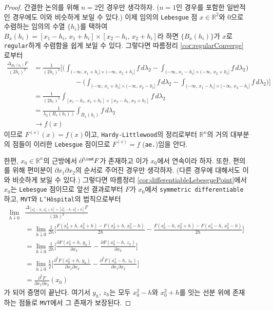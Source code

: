 \begin{proof}
    간결한 논의를 위해 $n=2$인 경우만 생각하자. ($n=1$인 경우를 포함한 일반적인 경우에도 이와 비슷하게 보일 수 있다.) 이제 임의의 \texttt{Lebesgue} 점 $x\in\mathbb{R}^2$와 $0$으로 수렴하는 임의의 수열 $\{h_i\}$를 택하여 $B_x(h_i)=[x_1-h_i,\,x_1+h_i]\times[x_2-h_i,\,x_2+h_i]$라 하면 $\{B_x(h_i)\}$가 $x$로 \texttt{regular}하게 수렴함을 쉽게 보일 수 있다. 그렇다면 따름정리 \ref{cor:regularConverge}로부터
    \begin{align*}
        \frac{\Delta_{B_x(h_i)}F}{(2h_i)^2}&=\frac{1}{(2h_i)^2}\bigg[\bigg(\int_{(-\infty,\,x_1+h_i]\times(-\infty,\,x_2+h_i]}f\,d\lambda_2-\int_{(-\infty,\,x_1-h_i]\times(-\infty,\,x_2+h_i]}f\,d\lambda_2\bigg)\\
        &\qquad\qquad\qquad-\bigg(\int_{(-\infty,\,x_1+h_i]\times(-\infty,\,x_2-h_i]}f\,d\lambda_2-\int_{(-\infty,\,x_1-h_i]\times(-\infty,\,x_2-h_i]}f\,d\lambda_2\bigg)\bigg]\\
        &=\frac{1}{(2h_i)^2}\int_{[x_1-h_i,\,x_1+h_i]\times[x_2-h_i,\,x_2+h_i]}f\,d\lambda_2\\
        &=\frac{1}{\lambda_2(B_x(h_i))}\int_{B_x(h_i)}f\,d\lambda_2\\
        &\to f(x)
    \end{align*}
    이므로 $F^{(s)}(x)=f(x)$이고, \texttt{Hardy-Littlewood}의 정리로부터 $\mathbb{R}^n$의 거의 대부분의 점들이 이러한 \texttt{Lebesgue} 점이므로 $F^{(s)}=f$ (\texttt{ae.})임을 안다.

    한편, $x_0\in\mathbb{R}^n$의 근방에서 $\partial^\ind F$가 존재하고 이가 $x_0$에서 연속이라 하자. 또한, 편의를 위해 편미분이 $\partial x_1\partial x_2$의 순서로 주어진 경우만 생각하자. (다른 경우에 대해서도 이와 비슷하게 보일 수 있다.) 그렇다면 따름정리 \ref{cor:differentiableLebesguePoint}에서 $x_0$는 \texttt{Lebesgue} 점이므로 앞선 결과로부터 $F$가 $x_0$에서 \texttt{symmetric differentiable}하고, \texttt{MVT}와 \texttt{L'H\^ospital}의 법칙으로부터
    \begin{align*}
        \lim_{h\downarrow0}&\frac{\Delta_{[x_0^1-h,\,x_0^1+h]\times[x_0^2-h,\,x_0^2+h]}F}{(2h)^2}\\
        &=\lim_{h\downarrow0}\frac{1}{2h}\bigg[\frac{F(x_0^1+h,\,x_0^2+h)-F(x_0^1+h,\,x_0^2-h)}{2h}-\frac{F(x_0^1-h,\,x_0^2+h)-F(x_0^1-h,\,x_0^2-h)}{2h}\bigg]\\
        &=\lim_{h\downarrow0}\frac{1}{2h}\bigg[\frac{\partial F(x_0^1+h,\,y_h)}{\partial x_2}-\frac{\partial F(x_0^1-h,\,z_h)}{\partial x_2}\bigg]\\
        &=\lim_{h\downarrow0}\frac{1}{2}\bigg[\frac{\partial^2F(x_0^1+h,\,y_h)}{\partial x_1\partial x_2}-\frac{\partial^2F(x_0^1-h,\,z_h)}{\partial x_1\partial x_2}\bigg]\\
        &=\frac{\partial^2 F}{\partial x_1\partial x_2}(x_0)
    \end{align*}
    가 되어 증명이 끝난다. 여기서 $y_h,\,z_h$는 모두 $x_0^2-h$와 $x_0^2+h$를 잇는 선분 위에 존재하는 점들로 \texttt{MVT}에서 그 존재가 보장된다.
\end{proof}

